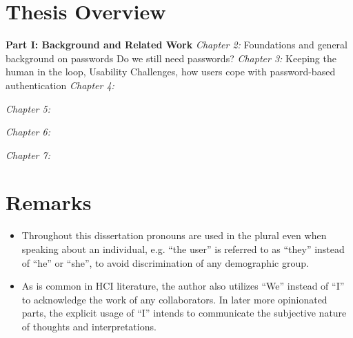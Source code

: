 %	
%	


\section{Thesis Overview}
\textbf{Part I: Background and Related Work}
\textit{Chapter 2:}
Foundations and general background on passwords
Do we still need passwords?
\textit{Chapter 3:}
Keeping the human in the loop, Usability Challenges, how users cope with password-based authentication
\textit{Chapter 4:}

\textit{Chapter 5:}

\textit{Chapter 6:}

\textit{Chapter 7:}


\section{Remarks}
\begin{itemize}
\item Throughout this dissertation pronouns are used in the plural even when speaking about an individual, e.g. ``the user'' is referred to as ``they'' instead of ``he'' or ``she'', to avoid discrimination of any demographic group. 
\item As is common in HCI literature, the author also utilizes ``We'' instead of ``I'' to acknowledge the work of any collaborators. In later more opinionated parts, the explicit usage of ``I'' intends to communicate the subjective nature of thoughts and interpretations.
\end{itemize}



